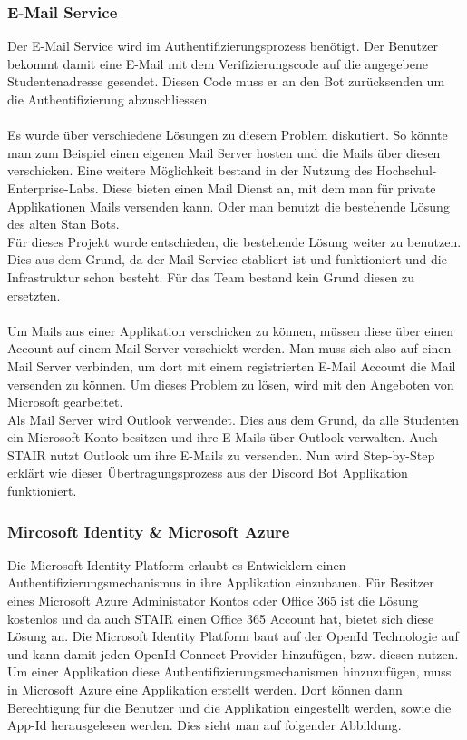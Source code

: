 \documentclass[a4paper, table]{article}
\begin{document}
\subsubsection{E-Mail Service}
Der E-Mail Service wird im Authentifizierungsprozess benötigt.
Der Benutzer bekommt damit eine E-Mail mit dem Verifizierungscode auf die angegebene Studentenadresse gesendet.
Diesen Code muss er an den Bot zurücksenden um die Authentifizierung abzuschliessen.\\\\
Es wurde über verschiedene Lösungen zu diesem Problem diskutiert.
So könnte man zum Beispiel einen eigenen Mail Server hosten und die Mails über diesen verschicken.
Eine weitere Möglichkeit bestand in der Nutzung des Hochschul-Enterprise-Labs.
Diese bieten einen Mail Dienst an, mit dem man für private Applikationen Mails versenden kann.
Oder man benutzt die bestehende Lösung des alten Stan Bots.\\
Für dieses Projekt wurde entschieden, die bestehende Lösung weiter zu benutzen.
Dies aus dem Grund, da der Mail Service etabliert ist und funktioniert und die Infrastruktur schon besteht.
Für das Team bestand kein Grund diesen zu ersetzten.\\\\
Um Mails aus einer Applikation verschicken zu können, müssen diese über einen Account auf einem Mail Server verschickt werden.
Man muss sich also auf einen Mail Server verbinden, um dort mit einem registrierten E-Mail Account die Mail versenden zu können.
Um dieses Problem zu lösen, wird mit den Angeboten von Microsoft gearbeitet.\\
Als Mail Server wird Outlook verwendet.
Dies aus dem Grund, da alle Studenten ein Microsoft Konto besitzen und ihre E-Mails über Outlook verwalten.
Auch STAIR nutzt Outlook um ihre E-Mails zu versenden.
Nun wird Step-by-Step erklärt wie dieser Übertragungsprozess aus der Discord Bot Applikation funktioniert.

\subsubsection*{Mircosoft Identity \& Microsoft Azure}
Die Microsoft Identity Platform erlaubt es Entwicklern einen Authentifizierungsmechanismus in ihre Applikation einzubauen.
Für Besitzer eines Microsoft Azure Administator Kontos oder Office 365 ist die Lösung kostenlos und da auch STAIR einen Office 365 Account hat,
bietet sich diese Lösung an.
Die Microsoft Identity Platform baut auf der OpenId Technologie auf und kann damit jeden OpenId Connect Provider hinzufügen, bzw. diesen nutzen.
Um einer Applikation diese Authentifizierungsmechanismen hinzuzufügen, muss in Microsoft Azure eine Applikation erstellt werden.
Dort können dann Berechtigung für die Benutzer und die Applikation eingestellt werden, sowie die App-Id herausgelesen werden. \autocite{}
Dies sieht man auf folgender Abbildung.
\end{document}

